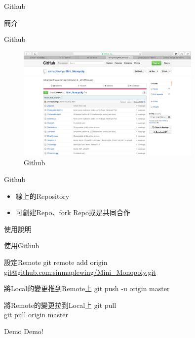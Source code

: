\documentclass[pdf,16pt]{beamer}
\begin{document}
   \begin{section}{Github}
    \begin{subsection}{簡介}
      \begin{frame}{Github}
        \begin{figure}[h!]
          \includegraphics[width=0.8\textwidth]{images/005.png} 
          \caption{Github}
        \end{figure}
      \end{frame}
      
      \begin{frame}{Github}
        \begin{itemize}
          \item 線上的Repository
          \item 可創建Repo、fork Repo或是共同合作
        \end{itemize}
      \end{frame}
    \end{subsection}
    
    \begin{subsection}{使用說明}
      \begin{frame}{使用Github}
        \begin{block}{設定Remote}
          git remote add origin \url{git@github.com:sinmaplewing/Mini_Monopoly.git}
        \end{block}
        
        \begin{block}{將Local的變更推到Remote上}
          git push -u origin master
        \end{block}
        
        \begin{block}{將Remote的變更拉到Local上}
          git pull\\
          git pull origin master
        \end{block}
        
      \end{frame}
      
      \begin{frame}{Demo}
        Demo!
      \end{frame}
     
    \end{subsection}
    
   \end{section}
   
\end{document}
